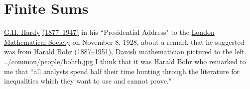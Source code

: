 ﻿%

\chapter{Finite Sums}

\qboxnps
  {
    \href{http://en.wikipedia.org/wiki/G.H._Hardy}{G.H. Hardy}
    \href{http://www-history.mcs.st-andrews.ac.uk/Timelines/TimelineG.html}{(1877--1947)}
    in his ``Presidential Address" to the
    \href{http://en.wikipedia.org/wiki/London_mathematical_society}{London Mathematical Society}
    on November 8, 1928, about a remark that he suggested was from
    \href{http://en.wikipedia.org/wiki/Harald_Bohr}{Harald Bohr}
    \href{http://www-history.mcs.st-andrews.ac.uk/Timelines/TimelineG.html}{(1887--1951)},
    \href{http://www-history.mcs.st-andrews.ac.uk/Countries/Denmark.html}{Danish}
    mathematician pictured to the left.
     
    \footnotemark
  }
  {../common/people/bohrh.jpg}
  {I think that it was Harald Bohr who remarked to me that
   ``all analysts spend half their time hunting through the literature
   for inequalities which they want to use and cannot prove." }

